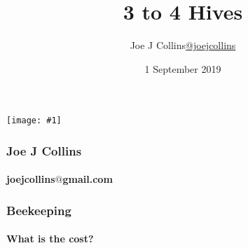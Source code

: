 \documentclass{beamer}
\title{3 to 4 Hives}
\author{Joe J Collins\href{https://twitter.com/joejcollins}{@joejcollins}}
\institute{Shropshire Beekeepers Association}
\date{1 September 2019}
\newcommand{\bigpicture}[1]{%
  \begin{list}{}{%
    \vspace*{-0.58cm}%
    \setlength{\topsep}{-0pt}%
    \setlength{\leftmargin}{-1.3cm}%
    \setlength{\rightmargin}{0pt}%
    \setlength{\listparindent}{\parindent}%
    \setlength{\itemindent}{\parindent}%
    \setlength{\parsep}{\parskip}%
  }%
  \item[]%
  \vspace*{\fill}
    \texttt{[image: \#1]}%
  \vspace*{\fill}
  \end{list}%
}%
\begin{document}
\begin{frame}
\bigpicture{../Assets/BbcTestCard.jpg}
\end{frame}

\frame{\titlepage}

\begin{frame}
\frametitle{Joe J Collins}
\framesubtitle{joejcollins$@$gmail.com}

\note{}
\end{frame}

\begin{frame}
\frametitle{Beekeeping}
\framesubtitle{What is the cost?}
\begin{center}

\end{center}
\end{frame}
\end{document}

